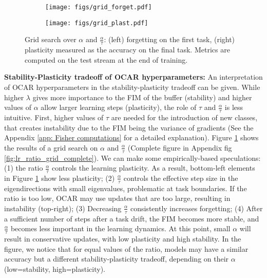 \begin{figure}[t]
    \begin{subfigure}[b]{0.45\textwidth}
        \centering
        \texttt{[image: figs/grid\_forget.pdf]}
    \end{subfigure}
    \begin{subfigure}[b]{0.45\textwidth}
        \centering
        \texttt{[image: figs/grid\_plast.pdf]}
    \end{subfigure}

    \caption{Grid search over $\alpha$ and $\frac{\alpha}{\tau}$: (left) forgetting on the first task, (right) plasticity measured as the accuracy on the final task. Metrics are computed on the test stream at the end of training.}\label{fig:lr_ratio_grid}
\end{figure}

\textbf{Stability-Plasticity tradeoff of OCAR hyperparameters:}
An interpretation of OCAR hyperparameters in the stability-plasticity tradeoff can be given.
While higher $\lambda$ gives more importance to the FIM of the buffer (stability) and higher values of $\alpha$ allow larger learning steps (plasticity), the role of $\tau$ and $\frac{\alpha}{\tau}$ is less intuitive. First, higher values of $\tau$ are needed for the introduction of new classes, that creates instability due to the FIM being the variance of gradients (See the Appendix \ref{app: Fisher computations} for a detailed explanation). Figure \ref{fig:lr_ratio_grid} shows the results of a grid search on $\alpha$ and $\frac{\alpha}{\tau}$ (Complete figure in Appendix fig \ref{fig:lr_ratio_grid_complete}). We can make some empirically-based speculations: (1) the ratio $\frac{\alpha}{\tau}$ controls the learning plasticity. As a result, bottom-left elements in Figure \ref{fig:lr_ratio_grid} show less plasticity; (2) $\frac{\alpha}{\tau}$ controls the effective step size in the eigendirections with small eigenvalues, problematic at task boundaries. If the ratio is too low, OCAR may use updates that are too large, resulting in instability (top-right); (3) Decreasing $\frac{\alpha}{\tau}$ consistently increases forgetting; (4) After a sufficient number of steps after a task drift, the FIM becomes more stable, and $\frac{\alpha}{\tau}$ becomes less important in the learning dynamics. At this point, small $\alpha$ will result in conservative updates, with low plasticity and high stability. In the figure, we notice that for equal values of the ratio, models may have a similar accuracy but a different stability-plasticity tradeoff, depending on their $\alpha$ (low=stability, high=plasticity). 

